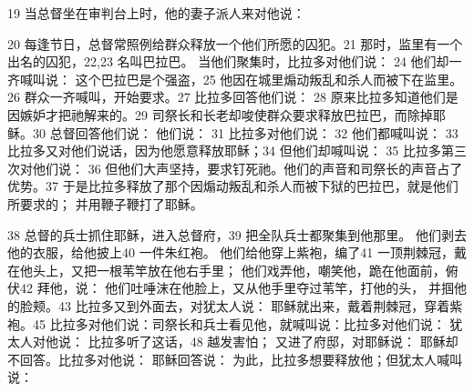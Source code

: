 19  当总督坐在审判台上时，他的妻子派人来对他说：\par

20  每逢节日，总督常照例给群众释放一个他们所愿的囚犯。21  那时，监里有一个出名的囚犯，22,23 名叫巴拉巴。 当他们聚集时，比拉多对他们说：  24  他们却一齐喊叫说： 这个巴拉巴是个强盗，25  他因在城里煽动叛乱和杀人而被下在监里。26  群众一齐喊叫，开始要求。27 比拉多回答他们说： 28  原来比拉多知道他们是因嫉妒才把祂解来的。29  司祭长和长老却唆使群众要求释放巴拉巴，而除掉耶稣。30  总督回答他们说： 他们说： 31  比拉多对他们说： 32  他们都喊叫说： 33  比拉多又对他们说话，因为他愿意释放耶稣；34  但他们却喊叫说： 35  比拉多第三次对他们说： 36  但他们大声坚持，要求钉死祂。他们的声音和司祭长的声音占了优势。37 于是比拉多释放了那个因煽动叛乱和杀人而被下狱的巴拉巴，就是他们所要求的； 并用鞭子鞭打了耶稣。\par

38  总督的兵士抓住耶稣，进入总督府，39  把全队兵士都聚集到他那里。 他们剥去他的衣服，给他披上40 一件朱红袍。 他们给他穿上紫袍，编了41 一顶荆棘冠，戴在他头上，又把一根苇竿放在他右手里； 他们戏弄他，嘲笑他，跪在他面前，俯伏42 拜他，说： 他们吐唾沫在他脸上，又从他手里夺过苇竿，打他的头， 并掴他的脸颊。43  比拉多又到外面去，对犹太人说： 耶稣就出来，戴着荆棘冠，穿着紫袍。45  比拉多对他们说：司祭长和兵士看见他，就喊叫说：比拉多对他们说： 犹太人对他说： 比拉多听了这话，48 越发害怕； 又进了府邸，对耶稣说： 耶稣却不回答。比拉多对他说： 耶稣回答说： 为此，比拉多想要释放他；但犹太人喊叫说：\par


